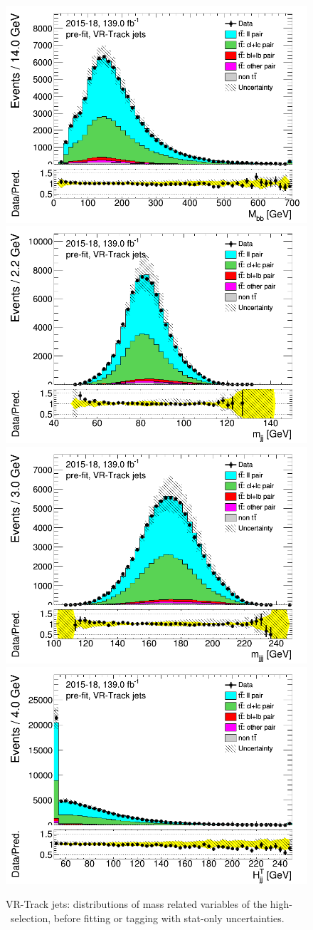 \documentclass[letterpaper,12pt]{article}
\begin{document}
\newpage
\begin{figure}[H]
\includegraphics[width=.45\textwidth]{FTAG_plots/pretagNoRwnewonlyVRJetsall/DataMC_h_Mbbtrackjet.png}
\includegraphics[width=.45\textwidth]{FTAG_plots/pretagNoRwnewonlyVRJetsall/DataMC_h_mjjtrackjet.png}\\
\includegraphics[width=.45\textwidth]{FTAG_plots/pretagNoRwnewonlyVRJetsall/DataMC_h_mjjjtrackjet.png}
\includegraphics[width=.45\textwidth]{FTAG_plots/pretagNoRwnewonlyVRJetsall/DataMC_h_Htjjtrackjet.png}\\
\caption{VR-Track jets: distributions of mass related variables of the high-\pt\ selection, 
before fitting or tagging with stat-only uncertainties.} \label{fig:highpT_mass_VRJets}
\end{figure}
\end{document}

